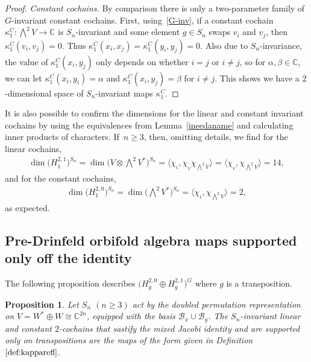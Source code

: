 \documentclass[pdftex]{sigma}
\numberwithin{equation}{section}
\newtheorem{Proposition}[Theorem]{Proposition}
 { \theoremstyle{definition}
\newtheorem{Definition}[Theorem]{Definition}
\newtheorem{Remark}[Theorem]{Remark}
\newtheorem{case}{Case}}
\begin{document}
\begin{proof}
\textit{Constant cochains.}
By comparison there is only a two-parameter family of $G$-invariant constant cochains.
First, using~\eqref{G-inv}, if a constant cochain $\kappa_1^C\colon \bigwedge^2 V\to \mathbb{C}$ is
$S_n$-invariant and some element $g \in S_n$ swaps $v_i$ and $v_j$, then $\kappa_1^C(v_i,v_j)=0$.
Thus $\kappa_1^C(x_i,x_j)=\kappa_1^C(y_i,y_j)=0$.
Also due to $S_n$-invariance, the value of $\kappa_1^C(x_i,y_j)$ only depends on whether $i=j$ or $i\neq j$, so for $\alpha,\beta\in\mathbb{C}$, we can let $\kappa_1^C(x_i,y_i)=\alpha$ and $\kappa_1^C(x_i,y_j)=\beta$ for $i\neq j$. This shows we have a $2$-dimensional space of $S_n$-invariant maps $\kappa_1^C$.
\end{proof}

\begin{Remark}
It is also possible to confirm the dimensions for the linear and constant invariant cochains by using the equivalences from Lemma~\ref{ineedaname} and calculating inner products of characters. If~$n\geq 3$, then, omitting details, we find
for the linear cochains,
\begin{gather*}
\dim\big(H_1^{2,1}\big)^{S_n}=\dim\Big(V\otimes\bigwedge\nolimits^{\! 2} V^*\Big)^{S_n}=\big\langle \chi_{\iota},\chi_{_V}\chi_{\bigwedge^2 V}\big\rangle=\big\langle\chi_{_V},\chi_{\bigwedge^2 V}\big\rangle =14,
\end{gather*}
and for the constant cochains,
\begin{gather*}
\dim \big(H_1^{2,0}\big)^{S_n}=\dim\Big(\bigwedge\nolimits^{\! 2} V^*\Big)^{S_n}=\langle\chi_{\iota},\chi_{\bigwedge^2 V} \rangle=2,
\end{gather*}
as expected.
\end{Remark}

\subsection{Pre-Drinfeld orbifold algebra maps supported only off the identity}

The following proposition describes $\big(H_g^{2,0}\oplus H_g^{2,1}\big)^G$
where $g$ is a transposition.

\begin{Proposition}
\label{prop:kapparefl}
Let $S_n$ $(n \geq 3)$ act by the doubled permutation representation on $V=W^* \oplus W \cong \mathbb{C}^{2n}$, equipped with the
basis $\mathcal{B}_x \cup \mathcal{B}_y$.
The $S_n$-invariant linear and constant $2$-cochains that sastify the mixed Jacobi identity and are supported only on transpositions are the maps of the form given in Definition~$\ref{def:kapparefl}$.
\end{Proposition}
\end{document}

